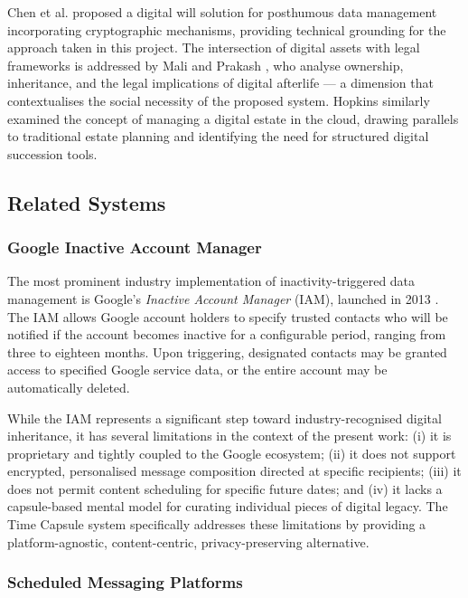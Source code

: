 \documentclass[12pt, a4paper]{article}
\begin{document}
Chen et al. \cite{chen2025} proposed a digital will solution for posthumous data management incorporating cryptographic mechanisms, providing technical grounding for the approach taken in this project. The intersection of digital assets with legal frameworks is addressed by Mali and Prakash \cite{mali2021}, who analyse ownership, inheritance, and the legal implications of digital afterlife — a dimension that contextualises the social necessity of the proposed system. Hopkins \cite{hopkins2013} similarly examined the concept of managing a digital estate in the cloud, drawing parallels to traditional estate planning and identifying the need for structured digital succession tools.

\subsection{Related Systems}

\subsubsection{Google Inactive Account Manager}

The most prominent industry implementation of inactivity-triggered data management is Google's \textit{Inactive Account Manager} (IAM), launched in 2013 \cite{google2013blog, google2024docs}. The IAM allows Google account holders to specify trusted contacts who will be notified if the account becomes inactive for a configurable period, ranging from three to eighteen months. Upon triggering, designated contacts may be granted access to specified Google service data, or the entire account may be automatically deleted.

While the IAM represents a significant step toward industry-recognised digital inheritance, it has several limitations in the context of the present work: (i) it is proprietary and tightly coupled to the Google ecosystem; (ii) it does not support encrypted, personalised message composition directed at specific recipients; (iii) it does not permit content scheduling for specific future dates; and (iv) it lacks a capsule-based mental model for curating individual pieces of digital legacy. The Time Capsule system specifically addresses these limitations by providing a platform-agnostic, content-centric, privacy-preserving alternative.

\subsubsection{Scheduled Messaging Platforms}
\end{document}
